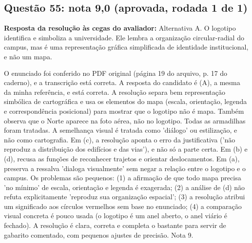 \documentclass{article}%
\begin{document}
\subsection*{Questão 55: nota 9,0 (aprovada, rodada 1 de 1)}%
\textbf{Resposta da resolução às cegas do avaliador:} Alternativa A. O logotipo identifica e simboliza a universidade. Ele lembra a organização circular{-}radial do campus, mas é uma representação gráfica simplificada de identidade institucional, e não um mapa.\par %
O enunciado foi conferido no PDF original (página 19 do arquivo, p. 17 do caderno), e a transcrição está correta. A resposta do candidato é (A), a mesma da minha referência, e está correta. A resolução separa bem representação simbólica de cartográfica e usa os elementos do mapa (escala, orientação, legenda e correspondência posicional) para mostrar que o logotipo não é mapa. Também observa que o Norte aparece na foto aérea, não no logotipo. Todas as armadilhas foram tratadas. A semelhança visual é tratada como 'diálogo' ou estilização, e não como cartografia. Em (c), a resolução aponta o erro da justificativa ('não reproduz a distribuição dos edifícios e das vias'), e não só a parte certa. Em (b) e (d), recusa as funções de reconhecer trajetos e orientar deslocamentos. Em (a), preserva a ressalva 'dialoga visualmente' sem negar a relação entre o logotipo e o campus. Os problemas são pequenos: (1) a afirmação de que todo mapa precisa 'no mínimo' de escala, orientação e legenda é exagerada; (2) a análise de (d) não refuta explicitamente 'reproduz sua organização espacial'; (3) a resolução atribui um significado aos círculos vermelhos sem base no enunciado; (4) a comparação visual concreta é pouco usada (o logotipo é um anel aberto, o anel viário é fechado). A resolução é clara, correta e completa o bastante para servir de gabarito comentado, com pequenos ajustes de precisão. Nota 9.%
\end{document}

